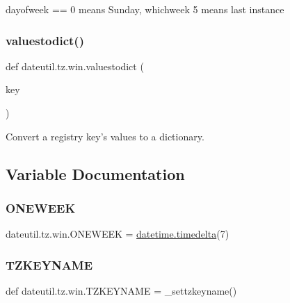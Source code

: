 \begin{DoxyVerb}dayofweek == 0 means Sunday, whichweek 5 means last instance \end{DoxyVerb}
 \mbox{\label{namespacedateutil_1_1tz_1_1win_ae1ad679865b6f4c022ff3a3069401067}} 
\subsubsection{\texorpdfstring{valuestodict()}{valuestodict()}}
{\footnotesize\ttfamily def dateutil.\+tz.\+win.\+valuestodict (\begin{DoxyParamCaption}\item[{}]{key }\end{DoxyParamCaption})}

\begin{DoxyVerb}Convert a registry key's values to a dictionary.\end{DoxyVerb}
 

\subsection{Variable Documentation}
\mbox{\label{namespacedateutil_1_1tz_1_1win_ad18e22949866f85aa1ec24d57b83c363}} 
\subsubsection{\texorpdfstring{O\+N\+E\+W\+E\+EK}{ONEWEEK}}
{\footnotesize\ttfamily dateutil.\+tz.\+win.\+O\+N\+E\+W\+E\+EK = \hyperlink{noprefix_8h_ae6feacec25f59b525f6e0c442ef75ff7}{datetime.\+timedelta}(7)}

\mbox{\label{namespacedateutil_1_1tz_1_1win_a343950883d60f5ee69dfeea2789ac094}} 
\subsubsection{\texorpdfstring{T\+Z\+K\+E\+Y\+N\+A\+ME}{TZKEYNAME}}
{\footnotesize\ttfamily def dateutil.\+tz.\+win.\+T\+Z\+K\+E\+Y\+N\+A\+ME = \+\_\+settzkeyname()}

